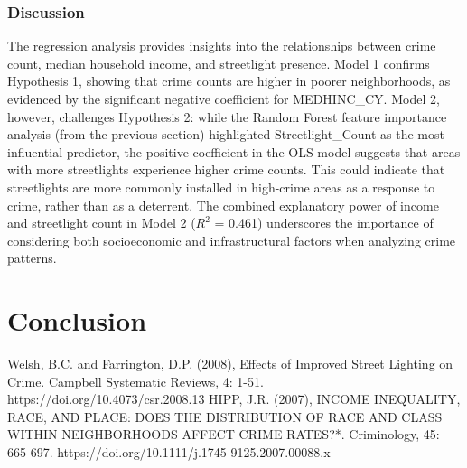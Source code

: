 \documentclass{report}
\begin{document}
\subsection{Discussion}
\par The regression analysis provides insights into the relationships between crime count, median household income, and streetlight presence. Model 1 confirms Hypothesis 1, showing that crime counts are higher in poorer neighborhoods, as evidenced by the significant negative coefficient for MEDHINC\_CY. Model 2, however, challenges Hypothesis 2: while the Random Forest feature importance analysis (from the previous section) highlighted Streetlight\_Count as the most influential predictor, the positive coefficient in the OLS model suggests that areas with more streetlights experience higher crime counts. This could indicate that streetlights are more commonly installed in high-crime areas as a response to crime, rather than as a deterrent. The combined explanatory power of income and streetlight count in Model 2 ($R^2$ = 0.461) underscores the importance of considering both socioeconomic and infrastructural factors when analyzing crime patterns.

\chapter{Conclusion}


\begin{thebibliography}{9}
  Welsh, B.C. and Farrington, D.P. (2008), Effects of Improved Street Lighting on Crime. Campbell Systematic Reviews, 4: 1-51. https://doi.org/10.4073/csr.2008.13
  HIPP, J.R. (2007), INCOME INEQUALITY, RACE, AND PLACE: DOES THE DISTRIBUTION OF RACE AND CLASS WITHIN NEIGHBORHOODS AFFECT CRIME RATES?*. Criminology, 45: 665-697. https://doi.org/10.1111/j.1745-9125.2007.00088.x
\end{thebibliography}
\end{document}
